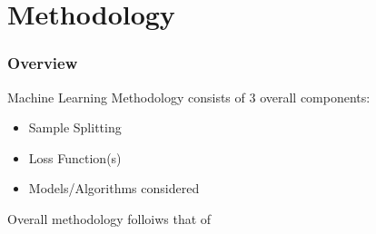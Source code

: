 \documentclass[aspectratio=169]{beamer}
\begin{document}
\section{Methodology}

\begin{frame}
\frametitle{Overview}
Machine Learning Methodology consists of 3 overall components:
\begin{itemize}
	\item Sample Splitting
	\item Loss Function(s)
	\item Models/Algorithms considered
\end{itemize}

Overall methodology folloiws that of \cite{gu_empirical_2018}
\end{frame}

\end{document}

